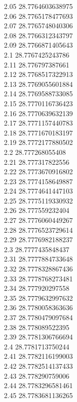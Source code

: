 {2.05	28.7764603638975\\
2.06	28.7765178477693\\
2.07	28.7765748040306\\
2.08	28.7766312343797\\
2.09	28.7766871405643\\
2.1	28.7767425243786\\
2.11	28.776797387661\\
2.12	28.7768517322913\\
2.13	28.7769055601884\\
2.14	28.7769588733085\\
2.15	28.7770116736423\\
2.16	28.7770639632139\\
2.17	28.7771157440783\\
2.18	28.7771670183197\\
2.19	28.7772177880502\\
2.2	28.777268055408\\
2.21	28.777317822556\\
2.22	28.7773670916802\\
2.23	28.7774158649887\\
2.24	28.7774641447103\\
2.25	28.7775119330932\\
2.26	28.777559232404\\
2.27	28.7776060449267\\
2.28	28.7776523729614\\
2.29	28.7776982188237\\
2.3	28.7777435848437\\
2.31	28.7777884733648\\
2.32	28.7778328867436\\
2.33	28.7778768273481\\
2.34	28.777920297558\\
2.35	28.7779632997632\\
2.36	28.7780058363636\\
2.37	28.7780479097684\\
2.38	28.778089522395\\
2.39	28.7781306766694\\
2.4	28.7781713750244\\
2.41	28.7782116199003\\
2.42	28.7782514137433\\
2.43	28.778290759006\\
2.44	28.7783296581461\\
2.45	28.7783681136265\\
}
